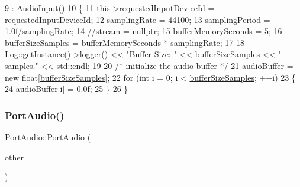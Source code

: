 \begin{DoxyCode}
9   : \mbox{\hyperlink{classAudioInput_a51903411fbfb29b77f30a0ee3fbaa50e}{AudioInput}}()
10 \{
11     this->requestedInputDeviceId = requestedInputDeviceId;
12     \mbox{\hyperlink{classAudioInput_acfe371c4f5790bd67d282bc83225728e}{samplingRate}} = 44100;
13     \mbox{\hyperlink{classAudioInput_a8b6ea4cd6b88e5cd9d051b298efbb65e}{samplingPeriod}} = 1.0f/\mbox{\hyperlink{classAudioInput_acfe371c4f5790bd67d282bc83225728e}{samplingRate}};
14     \textcolor{comment}{//stream = nullptr;}
15     \mbox{\hyperlink{classAudioInput_aea3145ccca0f7cebf36a78278ca44031}{bufferMemorySeconds}} = 5;
16     \mbox{\hyperlink{classAudioInput_a4e213a9a22a62dccc3a54369101559c7}{bufferSizeSamples}} = \mbox{\hyperlink{classAudioInput_aea3145ccca0f7cebf36a78278ca44031}{bufferMemorySeconds}} * 
      \mbox{\hyperlink{classAudioInput_acfe371c4f5790bd67d282bc83225728e}{samplingRate}};
17     
18     \mbox{\hyperlink{classLog_a987f3ff401eea783d0e80daaea1d7aca}{Log::getInstance}}()->\mbox{\hyperlink{classLog_a32d048a4924c7851c4b7b16758675af6}{logger}}() << \textcolor{stringliteral}{"Buffer Size: "} << 
      \mbox{\hyperlink{classAudioInput_a4e213a9a22a62dccc3a54369101559c7}{bufferSizeSamples}} << \textcolor{stringliteral}{" samples."} << std::endl;
19     
20     \textcolor{comment}{/* initialize the audio buffer */}
21     \mbox{\hyperlink{classAudioInput_a797943485896a381ea80947c8b6a8488}{audioBuffer}} = \textcolor{keyword}{new} \textcolor{keywordtype}{float}[\mbox{\hyperlink{classAudioInput_a4e213a9a22a62dccc3a54369101559c7}{bufferSizeSamples}}];
22     \textcolor{keywordflow}{for} (\textcolor{keywordtype}{int} i = 0; i < \mbox{\hyperlink{classAudioInput_a4e213a9a22a62dccc3a54369101559c7}{bufferSizeSamples}}; ++i)
23     \{
24         \mbox{\hyperlink{classAudioInput_a797943485896a381ea80947c8b6a8488}{audioBuffer}}[i] = 0.0f;
25     \}
26 \}
\end{DoxyCode}
\mbox{\label{classPortAudio_a5f84a7247f216657c54993180fc18c6c}} 
\subsubsection{\texorpdfstring{Port\+Audio()}{PortAudio()}\hspace{0.1cm}{\footnotesize\ttfamily [2/2]}}
{\footnotesize\ttfamily Port\+Audio\+::\+Port\+Audio (\begin{DoxyParamCaption}\item[{const \mbox{\hyperlink{classPortAudio}{Port\+Audio}} \&}]{other }\end{DoxyParamCaption})}

